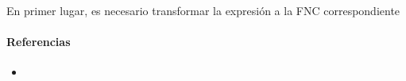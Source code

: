 \documentclass{article}
\begin{document}
\begin{itemize}
\begin{itemize}
		\paragraph{}
		En primer lugar, es necesario transformar la expresi\'on a la FNC correspondiente
	
		\begin{prooftree}
		\end{prooftree}
	
	\end{itemize}	
	
	
	
\end{itemize}


\paragraph{Referencias} 

\begin{itemize}

\item 

\end{itemize}
\end{document}
